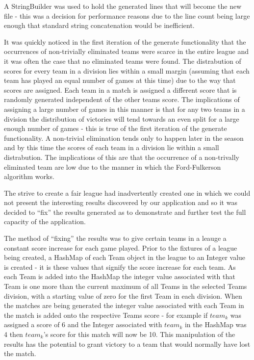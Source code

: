A StringBuilder was used to hold the generated lines that will become
the new file - this was a decision for performance reasons due to the
line count being large enough that standard string concatenation would
be inefficient.

It was quickly noticed in the first iteration of the generate
functionality that the occurrences of non-trivially eliminated teams
were scarce in the entire league and it was often the case that no
eliminated teams were found. The distrabution of scores for every team
in a division lies within a small margin (assuming that each team has
played an equal number of games at this time) due to the way that
scores are assigned. Each team in a match is assigned a different
score that is randomly generated independent of the other teams
score. The implications of assigning a large number of games in this
manner is that for any two teams in a division the distribution of
victories will tend towards an even split for a large enough number of
games - this is true of the first iteration of the generate
functionality. A non-trivial elimination tends only to happen later in
the season and by this time the scores of each team in a division lie
within a small distrabution. The implications of this are that the
occurrence of a non-trivally eliminated team are low due to the manner
in which the Ford-Fulkerson algorithm works.


The strive to create a fair league had inadvertently created one in
which we could not present the interesting results discovered by our
application and so it was decided to ``fix'' the results generated as
to demonstrate and further test the full capacity of the application.

The method of ``fixing'' the results was to give certain teams in a
leauge a constant score increase for each game played.
Prior to the fixtures of a league being created, a HashMap of each
Team object in the league to an Integer value is created - it is
these values that signify the score increase for each team. As each
Team is added into the HashMap the integer value associated with that
Team is one more than the current maximum of all Teams in the selected
Teams division, with a starting value of zero for the first Team in
each division. When the matches are being generated the integer value
associated with each Team in the match is added onto the respective
Teams score - for example if $team_k$ was assigned a score of 6 and the
Integer associated with $team_k$ in the HashMap was 4 then $team_k$'s
score for this match will now be 10. This manipulation of the results
has the potential to grant victory to a team that would normally have
lost the match.

